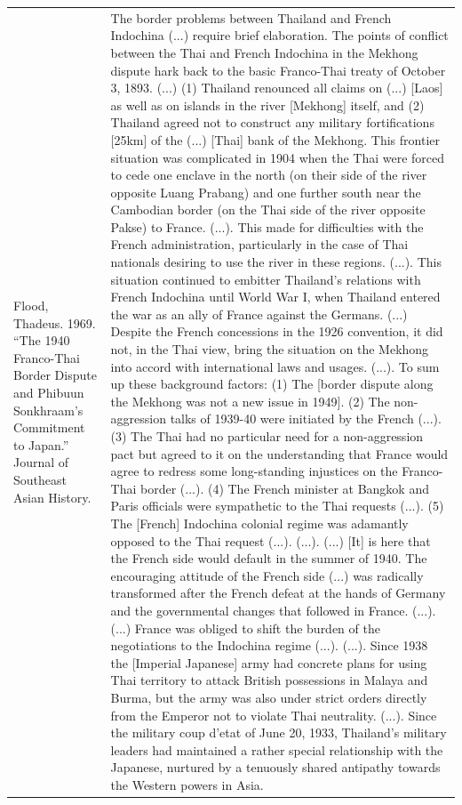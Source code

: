 {\begin{longtable}{p{}p{}}
\\
Flood, Thadeus. 1969. “The 1940 Franco-Thai Border Dispute and Phibuun Sonkhraam's Commitment to Japan.” Journal of Southeast Asian History. & The border problems between Thailand and French Indochina (...) require brief elaboration. The points of conflict between the Thai and French Indochina in the Mekhong dispute hark back to the basic Franco-Thai treaty of October 3, 1893. (...) (1) Thailand renounced all claims on (...) [Laos] as well as on islands in the river [Mekhong] itself, and (2) Thailand agreed not to construct any military fortifications [25km] of the (...) [Thai] bank of the Mekhong. This frontier situation was complicated in 1904 when the Thai were forced to cede one enclave in the north (on their side of the river opposite Luang Prabang) and one further south near the Cambodian border (on the Thai side of the river opposite Pakse) to France. (...). This made for difficulties with the French administration, particularly in the case of Thai nationals desiring to use the river in these regions. (...). This situation continued to embitter Thailand's relations with French Indochina until World War I, when Thailand entered the war as an ally of France against the Germans. (...) Despite the French concessions in the 1926 convention, it did not, in the Thai view, bring the situation on the Mekhong into accord with international laws and usages. (...). To sum up these background factors: (1) The [border dispute along the Mekhong was not a new issue in 1949]. (2) The non-aggression talks of 1939-40 were initiated by the French (...). (3) The Thai had no particular need for a non-aggression pact but agreed to it on the understanding that France would agree to redress some long-standing injustices on the Franco-Thai border (...). (4) The French minister at Bangkok and Paris officials were sympathetic to the Thai requests (...). (5) The [French] Indochina colonial regime was adamantly opposed to the Thai request (...). (...). (...) [It] is here that the French side would default in the summer of 1940. The encouraging attitude of the French side (...) was radically transformed after the French defeat at the hands of Germany and the governmental changes that followed in France. (...). (...) France was obliged to shift the burden of the negotiations to the Indochina regime (...). (...). Since 1938 the [Imperial Japanese] army had concrete plans for using Thai territory to attack British possessions in Malaya and Burma, but the army was also under strict orders directly from the Emperor not to violate Thai neutrality. (...). Since the military coup d'etat of June 20, 1933, Thailand's military leaders had maintained a rather special relationship with the Japanese, nurtured by a tenuously shared antipathy towards the Western powers in Asia.

\end{longtable}}
